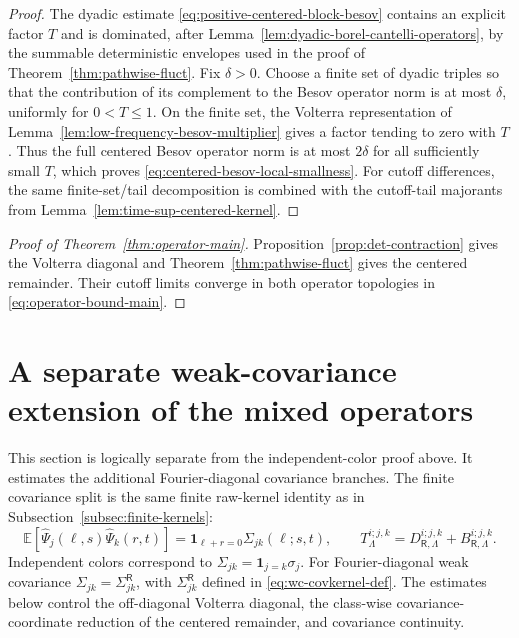 \documentclass[10pt]{amsart}
\numberwithin{equation}{section}
\theoremstyle{plain}
\theoremstyle{definition}
\theoremstyle{remark}
\newcommand{\E}{\mathbb{E}}
\begin{document}
\begin{proof}
The dyadic estimate \eqref{eq:positive-centered-block-besov} contains an explicit factor $T$ and is dominated, after Lemma~\ref{lem:dyadic-borel-cantelli-operators}, by the summable deterministic envelopes used in the proof of Theorem~\ref{thm:pathwise-fluct}.  Fix $\delta>0$.  Choose a finite set of dyadic triples so that the contribution of its complement to the Besov operator norm is at most $\delta$, uniformly for $0<T\le1$.  On the finite set, the Volterra representation of Lemma~\ref{lem:low-frequency-besov-multiplier} gives a factor tending to zero with $T$.  Thus the full centered Besov operator norm is at most $2\delta$ for all sufficiently small $T$, which proves \eqref{eq:centered-besov-local-smallness}.  For cutoff differences, the same finite-set/tail decomposition is combined with the cutoff-tail majorants from Lemma~\ref{lem:time-sup-centered-kernel}.
\end{proof}

\begin{proof}[Proof of Theorem~\ref{thm:operator-main}]
Proposition~\ref{prop:det-contraction} gives the Volterra diagonal and Theorem~\ref{thm:pathwise-fluct} gives the centered remainder.  Their cutoff limits converge in both operator topologies in \eqref{eq:operator-bound-main}.
\end{proof}



\section{A separate weak-covariance extension of the mixed operators}\label{subsec:weak-covariance-extension}
This section is logically separate from the independent-color proof above.  It estimates the additional Fourier-diagonal covariance branches.  The finite covariance split is the same finite raw-kernel identity as in Subsection~\ref{subsec:finite-kernels}:
\[
        \E[\widehat\Psi_j(\ell,s)\widehat\Psi_k(r,t)]
        =\mathbf 1_{\ell+r=0}\Sigma_{jk}(\ell;s,t),
        \qquad
        T_{\Lambda}^{i;j,k}=D_{\mathsf R,\Lambda}^{i;j,k}+B_{\mathsf R,\Lambda}^{i;j,k}.
\]
Independent colors correspond to \(\Sigma_{jk}=\mathbf 1_{j=k}\sigma_j\).  For Fourier-diagonal weak covariance \(\Sigma_{jk}=\Sigma_{jk}^{\mathsf R}\), with \(\Sigma_{jk}^{\mathsf R}\) defined in \eqref{eq:wc-covkernel-def}.  The estimates below control the off-diagonal Volterra diagonal, the class-wise covariance-coordinate reduction of the centered remainder, and covariance continuity.
\end{document}
